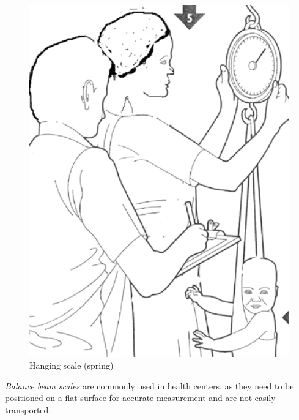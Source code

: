 \documentclass[12pt,]{book}
\begin{document}
\begin{figure}

{\centering \includegraphics[width=5.08in]{images/hangingScale} 

}

\caption{Hanging scale (spring)}\label{fig:unnamed-chunk-3}
\end{figure}

\emph{Balance beam scales} are commonly used in health centers, as they
need to be positioned on a flat surface for accurate measurement and are
not easily transported.
\end{document}
